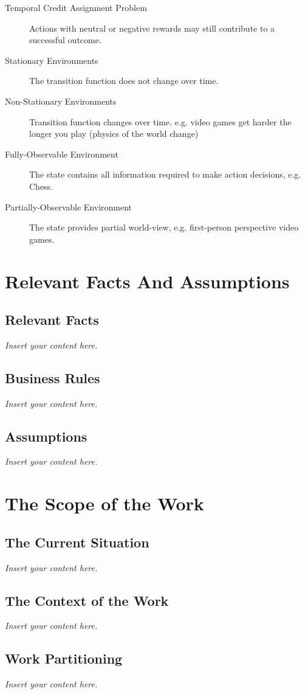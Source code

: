 \documentclass[12pt]{article}
\newcommand{\lips}{\textit{Insert your content here.}}
\begin{document}
\begin{description}
  \item [Temporal Credit Assignment Problem]\label{def:temporal_credit} Actions with neutral or negative rewards may still contribute to a successful outcome.
  \item [Stationary Environments]\label{def:stationary_env} The transition function does not change over time.
  \item [Non-Stationary Environments]\label{def:nonstationary_env} Transition function changes over time. e.g. video games get harder the longer you play (physics of the world change)
  \item [Fully-Observable Environment]\label{fully_obs_env} The state contains all information required to make action decisions, e.g. Chess.
  \item [Partially-Observable Environment]\label{partial_obs_env} The state provides partial world-view, e.g. first-person perspective video games.
\end{description}

\section{Relevant Facts And Assumptions}
\subsection{Relevant Facts}
\lips
\subsection{Business Rules}
\lips
\subsection{Assumptions}
\lips

\section{The Scope of the Work}
\subsection{The Current Situation}
\lips
\subsection{The Context of the Work}
\lips
\subsection{Work Partitioning}
\lips
\end{document}
